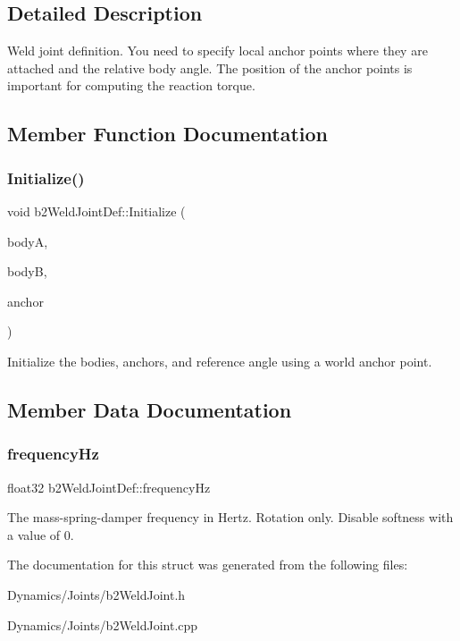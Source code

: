 \subsection{Detailed Description}
Weld joint definition. You need to specify local anchor points where they are attached and the relative body angle. The position of the anchor points is important for computing the reaction torque. 

\subsection{Member Function Documentation}
\mbox{\label{structb2WeldJointDef_a9f6592c2a7eba6ce6e07e40c4e82aab5}} 
\subsubsection{\texorpdfstring{Initialize()}{Initialize()}}
{\footnotesize\ttfamily void b2\+Weld\+Joint\+Def\+::\+Initialize (\begin{DoxyParamCaption}\item[{\mbox{\hyperlink{classb2Body}{b2\+Body}} $\ast$}]{bodyA,  }\item[{\mbox{\hyperlink{classb2Body}{b2\+Body}} $\ast$}]{bodyB,  }\item[{const \mbox{\hyperlink{structb2Vec2}{b2\+Vec2}} \&}]{anchor }\end{DoxyParamCaption})}

Initialize the bodies, anchors, and reference angle using a world anchor point. 

\subsection{Member Data Documentation}
\mbox{\label{structb2WeldJointDef_abf42ce852914af845e9203b341f55c87}} 
\subsubsection{\texorpdfstring{frequency\+Hz}{frequencyHz}}
{\footnotesize\ttfamily float32 b2\+Weld\+Joint\+Def\+::frequency\+Hz}

The mass-\/spring-\/damper frequency in Hertz. Rotation only. Disable softness with a value of 0. 

The documentation for this struct was generated from the following files\+:\begin{DoxyCompactItemize}
\item 
Dynamics/\+Joints/b2\+Weld\+Joint.\+h\item 
Dynamics/\+Joints/b2\+Weld\+Joint.\+cpp\end{DoxyCompactItemize}
